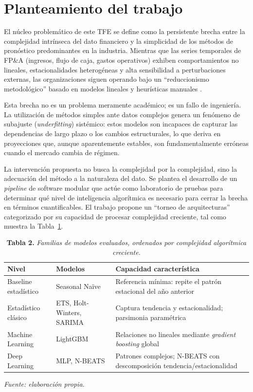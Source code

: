 \section{Planteamiento del trabajo}
\label{sec:planteamiento}

El núcleo problemático de este TFE se define como la persistente brecha entre la complejidad intrínseca del dato financiero y la simplicidad de los métodos de pronóstico predominantes en la industria. Mientras que las series temporales de FP\&A (ingresos, flujo de caja, gastos operativos) exhiben comportamientos no lineales, estacionalidades heterogéneas y alta sensibilidad a perturbaciones externas, las organizaciones siguen operando bajo un ``reduccionismo metodológico'' basado en modelos lineales y heurísticas manuales \parencite{Hyndman2021}.

Esta brecha no es un problema meramente académico; es un fallo de ingeniería. La utilización de métodos simples ante datos complejos genera un fenómeno de subajuste (\textit{underfitting}) sistémico: estos modelos son incapaces de capturar las dependencias de largo plazo o los cambios estructurales, lo que deriva en proyecciones que, aunque aparentemente estables, son fundamentalmente erróneas cuando el mercado cambia de régimen.

La intervención propuesta no busca la complejidad por la complejidad, sino la adecuación del método a la naturaleza del dato. Se plantea el desarrollo de un \textit{pipeline} de software modular que actúe como laboratorio de pruebas para determinar qué nivel de inteligencia algorítmica es necesario para cerrar la brecha en términos cuantificables. El trabajo propone un ``torneo de arquitecturas'' categorizado por su capacidad de procesar complejidad creciente, tal como muestra la Tabla~\ref{tab:arquitecturas}.

\begin{table}[H]
\caption{\textbf{Tabla 2.} \textit{Familias de modelos evaluados, ordenados por complejidad algorítmica creciente.}}
\label{tab:arquitecturas}
\vspace{4pt}
\begin{tabular}{>{\raggedright\arraybackslash}p{3.5cm} >{\raggedright\arraybackslash}p{3.5cm} >{\raggedright\arraybackslash}p{6cm}}
\toprule
\textbf{Nivel} & \textbf{Modelos} & \textbf{Capacidad característica} \\
\midrule
Baseline estadístico & Seasonal Naïve & Referencia mínima: repite el patrón estacional del año anterior \\
Estadístico clásico & ETS, Holt-Winters, SARIMA & Captura tendencia y estacionalidad; parsimonia paramétrica \\
Machine Learning & LightGBM & Relaciones no lineales mediante \textit{gradient boosting} global \\
Deep Learning & MLP, N-BEATS & Patrones complejos; N-BEATS con descomposición tendencia/estacionalidad \\
\bottomrule
\end{tabular}
\vspace{4pt}

\small\textit{Fuente: elaboración propia.}
\end{table}

